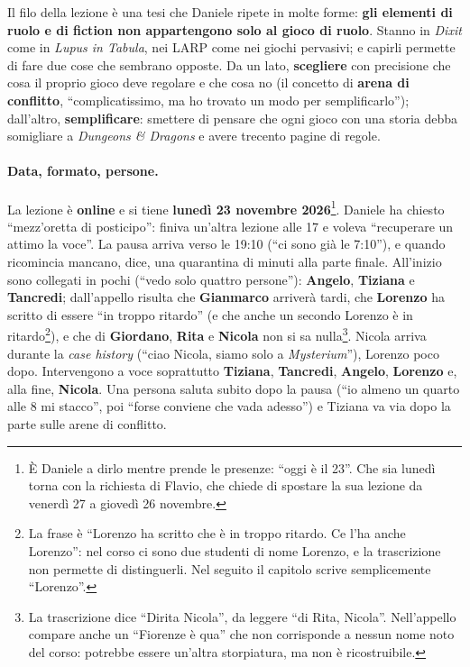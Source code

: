 Il filo della lezione è una tesi che Daniele ripete in molte forme: \textbf{gli elementi di
ruolo e di fiction non appartengono solo al gioco di ruolo}. Stanno in \emph{Dixit} come in
\emph{Lupus in Tabula}, nei LARP come nei giochi pervasivi; e capirli permette di fare due
cose che sembrano opposte. Da un lato, \textbf{scegliere} con precisione che cosa il proprio
gioco deve regolare e che cosa no (il concetto di \textbf{arena di conflitto}, ``complicatissimo,
ma ho trovato un modo per semplificarlo''); dall'altro, \textbf{semplificare}: smettere di
pensare che ogni gioco con una storia debba somigliare a \emph{Dungeons \& Dragons} e avere
trecento pagine di regole.

\paragraph{Data, formato, persone.} La lezione è \textbf{online} e si tiene
\textbf{lunedì 23 novembre 2026}\footnote{È Daniele a dirlo mentre prende le presenze:
``oggi è il 23''. Che sia lunedì torna con la richiesta di Flavio, che chiede di spostare la
sua lezione da venerdì 27 a giovedì 26 novembre.}. Daniele ha chiesto ``mezz'oretta di
posticipo'': finiva un'altra lezione alle 17 e voleva ``recuperare un attimo la voce''. La
pausa arriva verso le 19:10 (``ci sono già le 7:10''), e quando ricomincia mancano, dice, una
quarantina di minuti alla parte finale. All'inizio sono collegati in pochi (``vedo solo
quattro persone''): \textbf{Angelo}, \textbf{Tiziana} e \textbf{Tancredi}; dall'appello
risulta che \textbf{Gianmarco} arriverà tardi, che \textbf{Lorenzo} ha scritto di essere ``in
troppo ritardo'' (e che anche un secondo Lorenzo è in ritardo\footnote{La frase è ``Lorenzo ha
scritto che è in troppo ritardo. Ce l'ha anche Lorenzo'': nel corso ci sono due studenti di
nome Lorenzo, e la trascrizione non permette di distinguerli. Nel seguito il capitolo scrive
semplicemente ``Lorenzo''.}), e che di \textbf{Giordano}, \textbf{Rita} e \textbf{Nicola} non
si sa nulla\footnote{La trascrizione dice ``Dirita Nicola'', da leggere ``di Rita, Nicola''.
Nell'appello compare anche un ``Fiorenze è qua'' che non corrisponde a nessun nome noto del
corso: potrebbe essere un'altra storpiatura, ma non è ricostruibile.}. Nicola arriva durante
la \emph{case history} (``ciao Nicola, siamo solo a \emph{Mysterium}''), Lorenzo poco dopo.
Intervengono a voce soprattutto \textbf{Tiziana}, \textbf{Tancredi}, \textbf{Angelo},
\textbf{Lorenzo} e, alla fine, \textbf{Nicola}. Una persona saluta subito dopo la pausa (``io
almeno un quarto alle 8 mi stacco'', poi ``forse conviene che vada adesso'') e Tiziana va via
dopo la parte sulle arene di conflitto.


